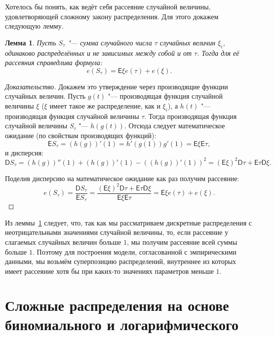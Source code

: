 \documentclass[12pt, specialist, subf, substylefile = spbu.rtx]{disser}
\newtheorem{lemma}{Лемма}
\begin{document}
	Хотелось бы понять, как ведёт себя рассеяние случайной величины, удовлетворяющей сложному закону распределения. Для этого докажем следующую лемму.
	
	\begin{lemma}
		Пусть $ S _\tau $ "--- сумма случайного числа $ \tau $ случайных величин $ \xi _i $, одинаково распределённых и не зависимых между собой и от $ \tau $. Тогда для её рассеяния справедлива формула:
		\[
			e (S _\tau) = \mathsf{E} \xi e (\tau) + e (\xi).
		\] 
		\label{lemma:1}
	\end{lemma}
	
	\begin{proof}[Доказательство]
		Докажем это утверждение через производящие функции случайных величин. Пусть $ g(t) $ "--- производящая функция случайной величины $ \xi $ ($ \xi $ имеет такое же распределение, как и $ \xi _i $), а $ h(t) $ "--- производящая функция случайной величины $ \tau $. Тогда производящая функция случайной величины $ S _\tau $ "--- $ h(g(t)) $.
		Отсюда следует математическое ожидание (по свойствам производящих функций):
		\[
			\mathsf{E} S _\tau = \left( h(g) \right)' (1) = h'(g(1)) g'(1) = \mathsf{E} \xi \mathsf{E} \tau, 
		\]
		и дисперсия:
		\[
			\mathsf{D} S _\tau = \left(h(g)\right)'' (1) + \left(h(g)\right)' (1) - \left( \left(h(g)\right)' (1) \right) ^2 = \left( \mathsf{E} \xi \right) ^2 \mathsf{D} \tau + \mathsf{E} \tau \mathsf{D} \xi.
		\]
		
		Поделив дисперсию на математическое ожидание как раз получим рассеяние:
		\[
			e (S _\tau) = \frac {\mathsf{D} S _\tau} {\mathsf{E} S _\tau} = \frac {\left( \mathsf{E} \xi \right) ^2 \mathsf{D} \tau + \mathsf{E} \tau \mathsf{D} \xi} {\mathsf{E} \xi \mathsf{E} \tau} = \mathsf{E} \xi e (\tau) + e (\xi).
		\]
	\end{proof}
	
	Из леммы~\ref{lemma:1} следует, что, так как мы рассматриваем дискретные распределения с неотрицательными значениями случайной величины, то, если рассеяние у слагаемых случайных величин больше $ 1 $, мы получим рассеяние всей суммы больше $ 1 $. Поэтому для построения модели, согласованной с эмпирическими данными, мы возьмём суперпозицию распределений, внутреннее из которых имеет рассеяние хотя бы при каких-то значениях параметров меньше $ 1 $.
	
	\chapter{Сложные распределения на основе биномиального и логарифмического}
	
\end{document}
